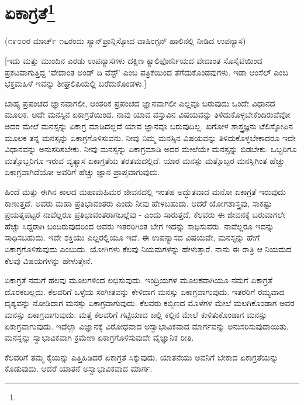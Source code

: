 
\chapter[ಏಕಾಗ್ರತೆ]{ಏಕಾಗ್ರತೆ\protect\footnote{}}

\begin{center}
(೧೯೦೦ರ ಮಾರ್ಚ್ ೧೬ರಂದು ಸ್ಯಾನ್‌ಫ್ರಾನ್ಸಿಸ್ಕೋದ ವಾಷಿಂಗ್ಟನ್ ಹಾಲಿನಲ್ಲಿ ನೀಡಿದ ಉಪನ್ಯಾಸ)
\end{center}

[ಇದು ಮತ್ತು ಮುಂದಿನ ಎರಡು ಉಪನ್ಯಾಸಗಳು ದಕ್ಷಿಣ ಕ್ಯಾಲಿಫೋರ್ನಿಯದ ವೇದಾಂತ ಸೊಸೈಟಿಯಿಂದ ಪ್ರಕಟವಾಗುತ್ತಿದ್ದ `ವೇದಾಂತ ಅಂಡ್ ದಿ ವೆಸ್ಟ್' ಎಂಬ ಪತ್ರಿಕೆಯಿಂದ ತೆಗೆದುಕೊಂಡವುಗಳು. ಇಡಾ ಆಂಸೆಲ್ ಎಂಬ ಭಕ್ತಮಹಿಳೆ ಇವನ್ನು ಶೀಘ್ರಲಿಪಿಯಲ್ಲಿ ಬರೆದುಕೊಂಡಳು.]

ಬಾಹ್ಯ ಪ್ರಪಂಚದ ಜ್ಞಾನವಾಗಲೀ, ಆಂತರಿಕ ಪ್ರಪಂಚದ ಜ್ಞಾನವಾಗಲೀ ಎಲ್ಲವೂ ಬರುವುದು ಒಂದೇ ವಿಧಾನದ ಮೂಲಕ. ಅದೇ ಮನಸ್ಸಿನ ಏಕಾಗ್ರತೆಯಿಂದ. ನಾವು ಯಾವ ವಸ್ತುವಿನ ವಿಷಯವನ್ನು ತಿಳಿದುಕೊಳ್ಳಬೇಕೆಂದಿರುವೆವೋ ಅದರ ಮೇಲೆ ಮನಸ್ಸನ್ನು ಏಕಾಗ್ರ ಮಾಡಿದಲ್ಲದೆ ಯಾವ ಜ್ಞಾನವೂ ಬರುವುದಿಲ್ಲ. ಖಗೋಳ ಶಾಸ್ತ್ರಜ್ಞನು ಟೆಲಿಸ್ಕೋಪಿನ ಮೂಲಕ ತನ್ನ ಮನಸ್ಸನ್ನು ಏಕಾಗ್ರಗೊಳಿಸುವನು. ನೀವು ನಿಮ್ಮ ಮನಸ್ಸಿನ ವಿಷಯವನ್ನು ತಿಳಿದುಕೊಳ್ಳಬೇಕಾದರೂ ಇದೇ ವಿಧಾನವನ್ನು ಅನುಸರಿಸಬೇಕು. ನೀವು ಮನಸ್ಸನ್ನು ಏಕಾಗ್ರಮಾಡಿ ಅದರ ಮೇಲೆಯೇ ಮನಸ್ಸನ್ನು ಬಿಡಬೇಕು. ಒಬ್ಬರಿಗೂ ಮತ್ತೊಬ್ಬರಿಗೂ ಇರುವ ವ್ಯತ್ಯಾಸ ಏಕಾಗ್ರತೆಯ ತರತಮದಲ್ಲಿದೆ. ಯಾರ ಮನಸ್ಸು ಮತ್ತೊಬ್ಬರ ಮನಸ್ಸಿಗಿಂತ ಹೆಚ್ಚು ಏಕಾಗ್ರವಾಗಿದೆಯೋ ಅವರಿಗೆ ಹೆಚ್ಚು ಜ್ಞಾನ ಪ್ರಾಪ್ತವಾಗುವುದು.

ಹಿಂದೆ ಮತ್ತು ಈಗಿನ ಕಾಲದ ಮಹಾಮಹಿಮರ ಜೀವನದಲ್ಲಿ ಇಂತಹ ಅದ್ಭುತವಾದ ಮನೋ ಏಕಾಗ್ರತೆ ಇರುವುದು ಕಾಣುತ್ತದೆ. ಅವರು ಮಹಾ ಪ್ರತಿಭಾವಂತರು ಎಂದು ನೀವು ಹೇಳಬಹುದು. ಆದರೆ ಯೋಗಶಾಸ್ತ್ರವು, ಸಾಕಷ್ಟು ಪ್ರಯತ್ನಪಟ್ಟರೆ ನಾವೆಲ್ಲರೂ ಪ್ರತಿಭಾವಂತರಾಗಬಲ್ಲೆವು - ಎಂದು ಸಾರುತ್ತದೆ. ಕೆಲವರು ಈ ಜೀವನಕ್ಕೆ ಬರುವಾಗಲೇ ಹೆಚ್ಚು ಸಿದ್ದರಾಗಿ ಬಂದಿರುವುದರಿಂದ ಅವರು ಇತರರಿಗಿಂತ ಬೇಗ ಇದನ್ನು ಸಾಧಿಸುವರು. ನಾವೆಲ್ಲರೂ ಇದನ್ನು ಸಾಧಿಸಬಹುದು. ಇದೇ ಶಕ್ತಿಯು ಎಲ್ಲರಲ್ಲಿಯೂ ಇದೆ. ಈ ಉಪನ್ಯಾಸದ ವಿಷಯವೇ, ಮನಸ್ಸನ್ನು ಹೇಗೆ ಏಕಾಗ್ರಗೊಳಿಸುವುದು ಎಂಬುದು. ಯೋಗಿಗಳು ಕೆಲವು ನಿಯಮಗಳನ್ನು ಹೇಳುತ್ತಾರೆ. ನಾನು ಈ ರಾತ್ರಿ ಆ ನಿಯಮದ ಕೆಲವು ವಿಷಯಗಳನ್ನು ಹೇಳುತ್ತೇನೆ.

ಏಕಾಗ್ರತೆ ನಮಗೆ ಹಲವು ಮೂಲಗಳಿಂದ ಲಭಿಸುವುದು. ಇಂದ್ರಿಯಗಳ ಮೂಲಕವಾಗಿಯೂ ನಮಗೆ ಏಕಾಗ್ರತೆ ದೊರಕಬಲ್ಲದು. ಕೆಲವರಿಗೆ ಒಳ್ಳೆಯ ಸಂಗೀತವನ್ನು ಕೇಳಿದಾಗ ಮನಸ್ಸು ಏಕಾಗ್ರವಾಗುವುದು. ಇತರರಿಗೆ ರಮ್ಯವಾದ ದೃಶ್ಯವನ್ನು ನೋಡಿದಾಗ ಮನಸ್ಸು ಏಕಾಗ್ರವಾಗುವುದು. ಕೆಲವರು ಕಬ್ಬಿಣದ ಮೊಳೆಗಳ ಮೇಲೆ ಮಲಗಿಕೊಂಡಾಗ ಅವರ ಮನಸ್ಸು ಏಕಾಗ್ರವಾಗುವುದು. ಮತ್ತೆ ಕೆಲವರಿಗೆ ಗಟ್ಟಿಯಾದ ಜಲ್ಲಿ ಕಲ್ಲಿನ ಮೇಲೆ ಕುಳಿತುಕೊಂಡಾಗ ಮನಸ್ಸು ಏಕಾಗ್ರವಾಗುವುದು. ಇದೆಲ್ಲಾ ವಿಜ್ಞಾನಕ್ಕೆ ವಿರೋಧವಾದ ಅಸ್ವಾಭಾವಿಕವಾದ ಮಾರ್ಗವನ್ನು ಅನುಸರಿಸುವುದಾಯಿತು. ಮನಸ್ಸನ್ನು ಸ್ವಾಭಾವಿಕವಾಗಿ ಕ್ರಮೇಣ ಏಕಾಗ್ರಗೊಳಿಸುವುದೇ ವೈಜ್ಞಾನಿಕ ರೀತಿ.

ಕೆಲವರಿಗೆ ತಮ್ಮ ಕೈಯನ್ನು ಎತ್ತಿಹಿಡಿದರೆ ಏಕಾಗ್ರತೆ ಸಿಕ್ಕುವುದು. ಯಾತನೆಯು ಅವನಿಗೆ ಬೇಕಾದ ಏಕಾಗ್ರತೆಯನ್ನು ಕೊಡುವುದು. ಆದರೆ ಯಾತನೆ ಅಸ್ವಾಭಾವಿಕವಾದ ಮಾರ್ಗ.

